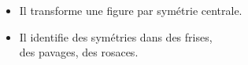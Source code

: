 \begin{prerequis}[Objectifs de 5\up{e}]      
    \begin{itemize}  
        \item Il transforme une figure par symétrie centrale.
        \columnbreak
        \item Il identifie des symétries dans des frises,\\ des pavages, des rosaces.
    \end{itemize}
\end{prerequis}
